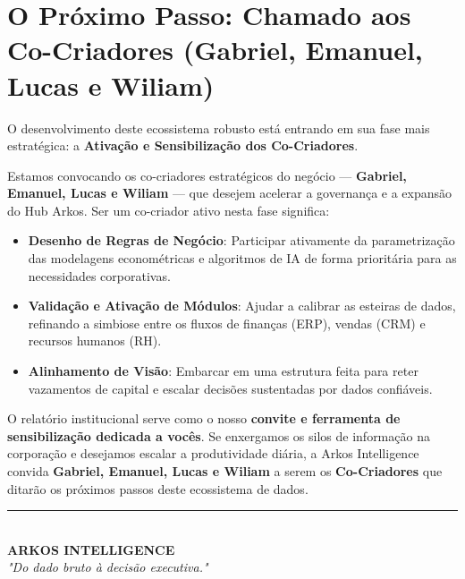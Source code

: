 \section{O Próximo Passo: Chamado aos Co-Criadores (Gabriel, Emanuel, Lucas e Wiliam)}
O desenvolvimento deste ecossistema robusto está entrando em sua fase mais estratégica: a \textbf{Ativação e Sensibilização dos Co-Criadores}.

Estamos convocando os co-criadores estratégicos do negócio — \textbf{Gabriel, Emanuel, Lucas e Wiliam} — que desejem acelerar a governança e a expansão do Hub Arkos. Ser um co-criador ativo nesta fase significa:
\begin{itemize}
    \item \textbf{Desenho de Regras de Negócio}: Participar ativamente da parametrização das modelagens econométricas e algoritmos de IA de forma prioritária para as necessidades corporativas.
    \item \textbf{Validação e Ativação de Módulos}: Ajudar a calibrar as esteiras de dados, refinando a simbiose entre os fluxos de finanças (ERP), vendas (CRM) e recursos humanos (RH).
    \item \textbf{Alinhamento de Visão}: Embarcar em uma estrutura feita para reter vazamentos de capital e escalar decisões sustentadas por dados confiáveis.
\end{itemize}

O relatório institucional serve como o nosso \textbf{convite e ferramenta de sensibilização dedicada a vocês}. Se enxergamos os silos de informação na corporação e desejamos escalar a produtividade diária, a Arkos Intelligence convida \textbf{Gabriel, Emanuel, Lucas e Wiliam} a serem os \textbf{Co-Criadores} que ditarão os próximos passos deste ecossistema de dados.

\vspace{1.5cm}
\begin{center}
    \rule{8cm}{0.4pt}\\
    \small \textbf{ARKOS INTELLIGENCE}\\
    \large \textit{"Do dado bruto à decisão executiva."}
\end{center}

\pagebreak
